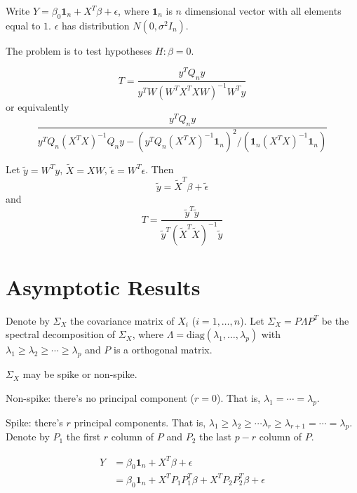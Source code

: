 \documentclass[review]{elsarticle}
\theoremstyle{plain}
\theoremstyle{definition}
\theoremstyle{remark}
\begin{document}
Write $Y=\beta_0 \textbf{1}_n+X^T \beta+\epsilon$, where $\textbf{1}_n$ is $n$ dimensional vector with all elements equal to $1$. $\epsilon$ has distribution $N(0,\sigma^2 I_n)$.

The problem is to test hypotheses $H: \beta=0$.




\[
    T=\frac{y^T Q_n y}{
        y^T W{(W^T X^T X W)}^{-1}W^T y
    } 
    \]
or equivalently
\[
    \frac{y^T Q_n y}{
        y^T Q_n{(X^T X)}^{-1}Q_n y-{(y^T Q_n{(X^T X)}^{-1}\textbf{1}_n)}^2/(\textbf{1}_n{(X^T X)}^{-1}\textbf{1}_n)
    } 
    \]


Let $\tilde{y}=W^T y$, $\tilde{X}=XW$, $\tilde{\epsilon}=W^T \epsilon$. Then
\[
    \tilde{y}=\tilde{X}^T \beta + \tilde{\epsilon}
    \]
and
\[
    T=\frac{\tilde{y}^T \tilde{y}}{
        \tilde{y}^T{(\tilde{X}^T \tilde{X})}^{-1}\tilde{y}
    }
    \]

\section{Asymptotic Results}

Denote by $\Sigma_X$ the covariance matrix of $X_i$ ($i=1,\ldots,n$). Let $\Sigma_X=P\Lambda P^T$ be the spectral decomposition of $\Sigma_X$, where $\Lambda=\textrm{diag}(\lambda_1,\ldots,\lambda_p)$ with $\lambda_1\geq \lambda_2\geq \cdots \geq \lambda_p$ and $P$ is a orthogonal matrix.

$\Sigma_X$ may be spike or non-spike.

Non-spike: there's no principal component ($r=0$). That is, $\lambda_1=\cdots = \lambda_p$.

Spike: there's $r$ principal components. That is, $\lambda_1\geq \lambda_2\geq \cdots \lambda_r\geq \lambda_{r+1}=\cdots =\lambda_p$. Denote by $P_1$ the first $r$ column of $P$ and $P_2$ the last $p-r$ column of $P$.

\begin{equation}
    \begin{aligned}
        Y&=\beta_0 \textbf{1}_n+X^T\beta+\epsilon\\
        &=\beta_0 \textbf{1}_n+X^T P_1P_1^T\beta+X^T P_2 P_2^T\beta+\epsilon\\
    \end{aligned}
\end{equation}
\end{document}
